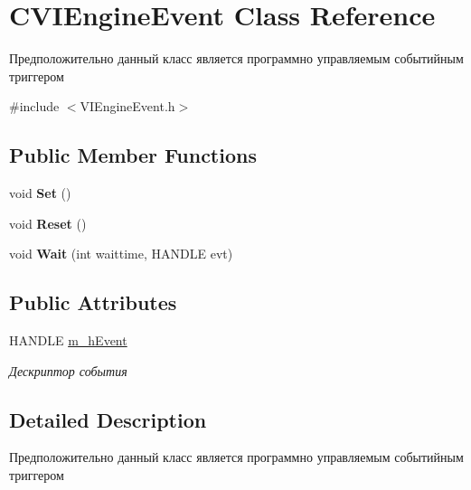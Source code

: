 \hypertarget{class_c_v_i_engine_event}{\section{C\+V\+I\+Engine\+Event Class Reference}
\label{class_c_v_i_engine_event}
}


Предположительно данный класс является программно управляемым событийным триггером  




{\ttfamily \#include $<$V\+I\+Engine\+Event.\+h$>$}

\subsection*{Public Member Functions}
\begin{DoxyCompactItemize}
\item 
\hypertarget{class_c_v_i_engine_event_ac8b45598bd3dc7c78d7a282c5c9da31c}{void {\bfseries Set} ()}\label{class_c_v_i_engine_event_ac8b45598bd3dc7c78d7a282c5c9da31c}

\item 
\hypertarget{class_c_v_i_engine_event_aca0e4a51d2caf10abc279951b16caf45}{void {\bfseries Reset} ()}\label{class_c_v_i_engine_event_aca0e4a51d2caf10abc279951b16caf45}

\item 
\hypertarget{class_c_v_i_engine_event_a7df18564e4e71869ffd52ddf7ae9abc3}{void {\bfseries Wait} (int waittime, H\+A\+N\+D\+L\+E evt)}\label{class_c_v_i_engine_event_a7df18564e4e71869ffd52ddf7ae9abc3}

\end{DoxyCompactItemize}
\subsection*{Public Attributes}
\begin{DoxyCompactItemize}
\item 
H\+A\+N\+D\+L\+E \hyperlink{class_c_v_i_engine_event_a46978ca1891c378503c533b3a5b714ef}{m\+\_\+h\+Event}
\begin{DoxyCompactList}\small\item\em Дескриптор события \end{DoxyCompactList}\end{DoxyCompactItemize}


\subsection{Detailed Description}
Предположительно данный класс является программно управляемым событийным триггером 



